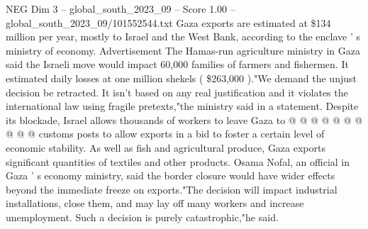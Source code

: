 \begin{textsample}{NEG Dim 3 – global\_south\_2023\_09 – Score 1.00 – global\_south\_2023\_09/101552544.txt}
Gaza exports are estimated at \$134 million per year, mostly to Israel and the West Bank, according to the enclave ' s ministry of economy.
Advertisement The Hamas-run agriculture ministry in Gaza said the Israeli move would impact 60,000 families of farmers and fishermen.
It estimated daily losses at one million shekels ( \$263,000 )."We demand the unjust decision be retracted.
It isn't based on any real justification and it violates the international law using fragile pretexts,"the ministry said in a statement.
Despite its blockade, Israel allows thousands of workers to leave Gaza to @ @ @ @ @ @ @ @ @ @ customs posts to allow exports in a bid to foster a certain level of economic stability.
As well as fish and agricultural produce, Gaza exports significant quantities of textiles and other products.
Osama Nofal, an official in Gaza ' s economy ministry, said the border closure would have wider effects beyond the immediate freeze on exports."The decision will impact industrial installations, close them, and may lay off many workers and increase unemployment.
Such a decision is purely catastrophic,"he said.

\end{textsample}
